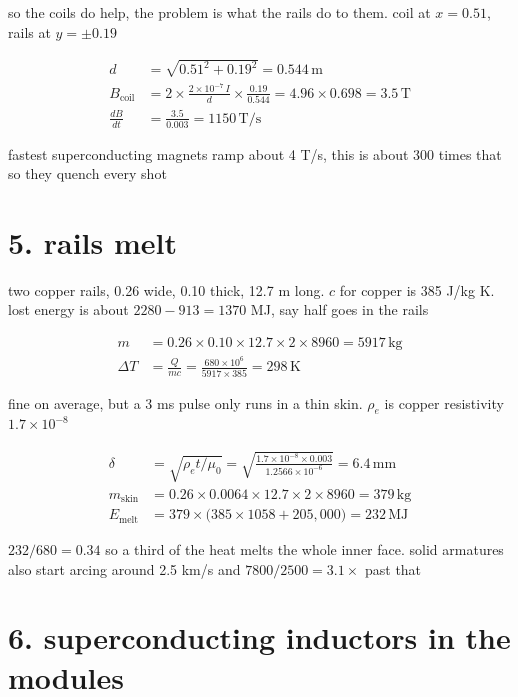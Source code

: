 \documentclass[11pt]{article}
\newcommand{\un}[1]{\,\mathrm{#1}}
\begin{document}
so the coils do help, the problem is what the rails do to them. coil at $x = 0.51$, rails at $y = \pm0.19$

\begin{align*}
d &= \sqrt{0.51^2 + 0.19^2} = 0.544\un{m}\\
B_{\text{coil}} &= 2 \times \frac{2\times10^{-7}\, I}{d} \times \frac{0.19}{0.544} = 4.96 \times 0.698 = 3.5\un{T}\\
\frac{dB}{dt} &= \frac{3.5}{0.003} = 1150\un{T/s}
\end{align*}

fastest superconducting magnets ramp about 4 T/s, this is about 300 times that so they quench every shot

\section*{5. rails melt}

two copper rails, 0.26 wide, 0.10 thick, 12.7 m long. $c$ for copper is 385 J/kg K. lost energy is about $2280 - 913 = 1370$ MJ, say half goes in the rails

\begin{align*}
m &= 0.26 \times 0.10 \times 12.7 \times 2 \times 8960 = 5917\un{kg}\\
\Delta T &= \frac{Q}{mc} = \frac{680\times10^6}{5917 \times 385} = 298\un{K}
\end{align*}

fine on average, but a 3 ms pulse only runs in a thin skin. $\rho_e$ is copper resistivity $1.7\times10^{-8}$

\begin{align*}
\delta &= \sqrt{\rho_e t/\mu_0} = \sqrt{\frac{1.7\times10^{-8}\times0.003}{1.2566\times10^{-6}}} = 6.4\un{mm}\\
m_{\text{skin}} &= 0.26 \times 0.0064 \times 12.7 \times 2 \times 8960 = 379\un{kg}\\
E_{\text{melt}} &= 379 \times \big(385 \times 1058 + 205{,}000\big) = 232\un{MJ}
\end{align*}

$232/680 = 0.34$ so a third of the heat melts the whole inner face. solid armatures also start arcing around 2.5 km/s and $7800/2500 = 3.1\times$ past that

\section*{6. superconducting inductors in the modules}
\end{document}
